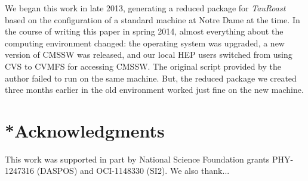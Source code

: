 \documentclass{sig-alternate}
\begin{document}
We began this work in late 2013, generating a reduced package for \emph{TauRoast} based
on the configuration of a standard machine at Notre Dame at the time.  In the course
of writing this paper in spring 2014, almost everything about the computing environment
changed: the operating system was upgraded, a new version of CMSSW was released, and
our local HEP users switched from using CVS to CVMFS for accessing CMSSW.
The original script provided by the author failed to run on the same machine.
But, the reduced package we created three months earlier in the old environment
worked just fine on the new machine.

\section{*Acknowledgments}

This work was supported in part by National Science Foundation grants PHY-1247316 (DASPOS)
and OCI-1148330 (SI2).  We also thank...



\end{document}
